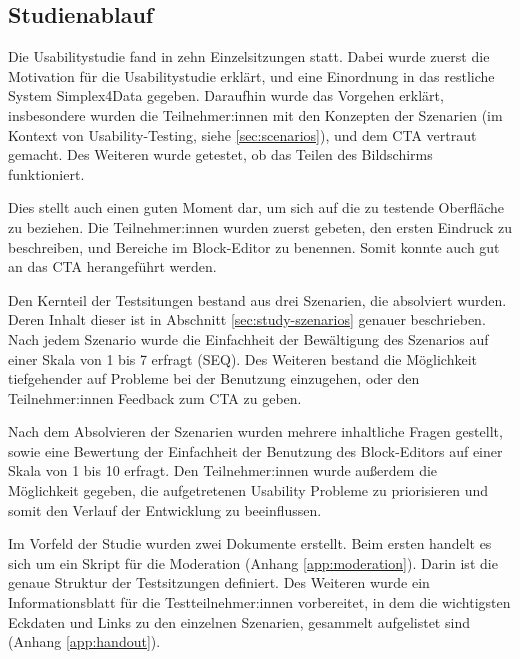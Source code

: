 \subsection{Studienablauf}

Die Usabilitystudie fand in zehn Einzelsitzungen statt. Dabei wurde zuerst die Motivation für die Usabilitystudie erklärt, und eine Einordnung in das restliche System Simplex4Data gegeben. Daraufhin wurde das Vorgehen erklärt, insbesondere wurden die Teilnehmer:innen mit den Konzepten der Szenarien (im Kontext von Usability-Testing, siehe \ref{sec:scenarios}), und dem \ac{CTA} vertraut gemacht. Des Weiteren wurde getestet, ob das Teilen des Bildschirms funktioniert.

Dies stellt auch einen guten Moment dar, um sich auf die zu testende Oberfläche zu beziehen. Die Teilnehmer:innen wurden zuerst gebeten, den ersten Eindruck zu beschreiben, und Bereiche im Block-Editor zu benennen. Somit konnte auch gut an das \ac{CTA} herangeführt werden.

Den Kernteil der Testsitungen bestand aus drei Szenarien, die absolviert wurden. Deren Inhalt dieser ist in Abschnitt \ref{sec:study-szenarios} genauer beschrieben. Nach jedem Szenario wurde die Einfachheit der Bewältigung des Szenarios auf einer Skala von 1 bis 7 erfragt (\ac{SEQ}). Des Weiteren bestand die Möglichkeit tiefgehender auf Probleme bei der Benutzung einzugehen, oder den Teilnehmer:innen Feedback zum \ac{CTA} zu geben.

Nach dem Absolvieren der Szenarien wurden mehrere inhaltliche Fragen gestellt, sowie eine Bewertung der Einfachheit der Benutzung des Block-Editors auf einer Skala von 1 bis 10 erfragt. Den Teilnehmer:innen wurde außerdem die Möglichkeit gegeben, die aufgetretenen Usability Probleme zu priorisieren und somit den Verlauf der Entwicklung zu beeinflussen.

Im Vorfeld der Studie wurden zwei Dokumente erstellt. Beim ersten handelt es sich um ein Skript für die Moderation (Anhang \ref{app:moderation}). Darin ist die genaue Struktur der Testsitzungen definiert. Des Weiteren wurde ein Informationsblatt für die Testteilnehmer:innen vorbereitet, in dem die wichtigsten Eckdaten und Links zu den einzelnen Szenarien, gesammelt aufgelistet sind (Anhang \ref{app:handout}).
